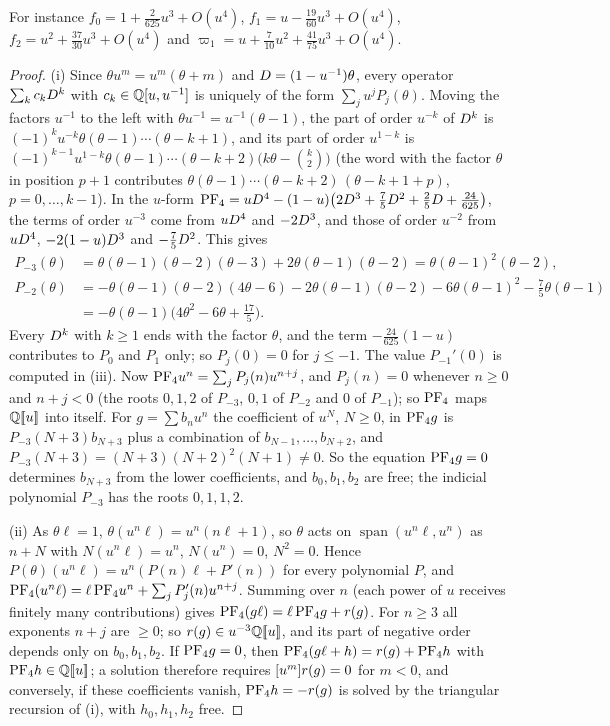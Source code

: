 For instance $f_0=1+\frac2{625}u^3+O(u^4)$, $f_1=u-\frac{19}{60}u^3+O(u^4)$, $f_2=u^2+\frac{37}{30}u^3+O(u^4)$ and $\varpi_1=u+\frac7{10}u^2+\frac{41}{75}u^3+O(u^4)$.

\begin{proof}
(i) Since $\theta u^m=u^m(\theta+m)$ and $D=(1-u^{-1})\theta$, every operator $\sum_kc_kD^k$ with $c_k\in\mathbb{Q}[u,u^{-1}]$ is uniquely of the form $\sum_ju^jP_j(\theta)$. Moving the factors $u^{-1}$ to the left with $\theta u^{-1}=u^{-1}(\theta-1)$, the part of order $u^{-k}$ of $D^k$ is $(-1)^ku^{-k}\theta(\theta-1)\cdots(\theta-k+1)$, and its part of order $u^{1-k}$ is $(-1)^{k-1}u^{1-k}\theta(\theta-1)\cdots(\theta-k+2)\bigl(k\theta-\binom k2\bigr)$ (the word with the factor $\theta$ in position $p+1$ contributes $\theta(\theta-1)\cdots(\theta-k+2)\,(\theta-k+1+p)$, $p=0,\dots,k-1$). In the $u$-form $\mathrm{PF}_{4}=uD^4-(1-u)\bigl(2D^3+\frac75D^2+\frac25D+\frac{24}{625}\bigr)$, the terms of order $u^{-3}$ come from $uD^4$ and $-2D^3$, and those of order $u^{-2}$ from $uD^4$, $-2(1-u)D^3$ and $-\frac75D^2$. This gives
\begin{align*}
P_{-3}(\theta)&=\theta(\theta-1)(\theta-2)(\theta-3)+2\theta(\theta-1)(\theta-2)=\theta(\theta-1)^2(\theta-2),\\
P_{-2}(\theta)&=-\theta(\theta-1)(\theta-2)(4\theta-6)-2\theta(\theta-1)(\theta-2)-6\theta(\theta-1)^2-\tfrac75\theta(\theta-1)\\
&=-\theta(\theta-1)\bigl(4\theta^2-6\theta+\tfrac{17}5\bigr).
\end{align*}
Every $D^k$ with $k\geq1$ ends with the factor $\theta$, and the term $-\frac{24}{625}(1-u)$ contributes to $P_0$ and $P_1$ only; so $P_j(0)=0$ for $j\leq-1$. The value $P_{-1}'(0)$ is computed in (iii). Now $\mathrm{PF}_{4} u^n=\sum_jP_j(n)u^{n+j}$, and $P_j(n)=0$ whenever $n\geq0$ and $n+j<0$ (the roots $0,1,2$ of $P_{-3}$, $0,1$ of $P_{-2}$ and $0$ of $P_{-1}$); so $\mathrm{PF}_{4}$ maps $\mathbb{Q}[\![ u ]\!]$ into itself. For $g=\sum b_nu^n$ the coefficient of $u^N$, $N\geq0$, in $\mathrm{PF}_{4} g$ is $P_{-3}(N+3)b_{N+3}$ plus a combination of $b_{N-1},\dots,b_{N+2}$, and $P_{-3}(N+3)=(N+3)(N+2)^2(N+1)\neq0$. So the equation $\mathrm{PF}_{4} g=0$ determines $b_{N+3}$ from the lower coefficients, and $b_0,b_1,b_2$ are free; the indicial polynomial $P_{-3}$ has the roots $0,1,1,2$.

(ii) As $\theta\ell=1$, $\theta(u^n\ell)=u^n(n\ell+1)$, so $\theta$ acts on $\operatorname{span}(u^n\ell,u^n)$ as $n+N$ with $N(u^n\ell)=u^n$, $N(u^n)=0$, $N^2=0$. Hence $P(\theta)(u^n\ell)=u^n(P(n)\ell+P'(n))$ for every polynomial $P$, and $\mathrm{PF}_{4}(u^n\ell)=\ell\,\mathrm{PF}_{4} u^n+\sum_jP_j'(n)u^{n+j}$. Summing over $n$ (each power of $u$ receives finitely many contributions) gives $\mathrm{PF}_{4}(g\ell)=\ell\,\mathrm{PF}_{4} g+r(g)$. For $n\geq3$ all exponents $n+j$ are $\geq0$; so $r(g)\in u^{-3}\mathbb{Q}[\![ u ]\!]$, and its part of negative order depends only on $b_0,b_1,b_2$. If $\mathrm{PF}_{4} g=0$, then $\mathrm{PF}_{4}(g\ell+h)=r(g)+\mathrm{PF}_{4} h$ with $\mathrm{PF}_{4} h\in\mathbb{Q}[\![ u ]\!]$; a solution therefore requires $[u^m]r(g)=0$ for $m<0$, and conversely, if these coefficients vanish, $\mathrm{PF}_{4} h=-r(g)$ is solved by the triangular recursion of (i), with $h_0,h_1,h_2$ free.


\end{proof}
